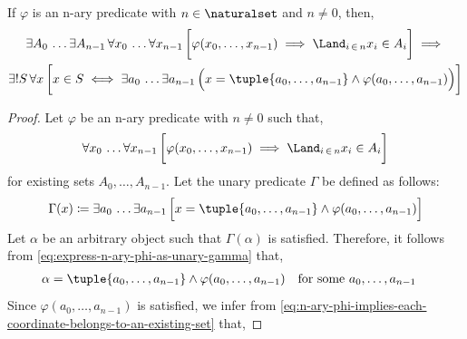 \begin{thm}
    \label{thm:sufficient-condition-for-unrestricted-specification-for-tuples}
    If \( \varphi \) is an n-ary predicate with \( n \in \naturalset \) and \( n \neq 0 \), then,
    \begin{multline*}
        \exists A_{0} \,\dots \exists A_{n-1} \, \forall x_{0} \,\dots \forall x_{n-1} \, \bigg[ \varphi(x_{0},\dots,x_{n-1})
        \implies \Land_{i \,{\in}\, n} x_{i} \in A_{i} \bigg] \implies \\
        \exists! S \, \forall x \, \bigg[ x \in S \iff \exists a_{0} \, \dots \exists a_{n-1} \, \Big( x = \tuple{a_{0},\dots,a_{n-1}} \land \varphi(a_{0},\dots,a_{n-1}) \Big) \bigg]
    \end{multline*}
\end{thm}

\begin{proof}
    Let \( \varphi \) be an n-ary predicate with \( n \neq 0 \) such that,
    \begin{equation}
        \label{eq:n-ary-phi-implies-each-coordinate-belongs-to-an-existing-set}
        \forall x_{0} \, \dots \forall x_{n-1} \, \bigg[ \varphi(x_{0},\dots,x_{n-1}) \implies \Land_{i \,\in\, n} x_{i} \in A_{i} \bigg]
    \end{equation}
    for existing sets \( A_{0},\dots,A_{n-1} \).
    Let the unary predicate \( \Gamma \) be defined as follows:
    \begin{equation}
        \label{eq:express-n-ary-phi-as-unary-gamma}
        \Gamma(x) \coloneq \exists a_{0} \, \dots \exists a_{n-1} \, \Big[ x = \tuple{a_{0},\dots,a_{n-1}} \land \varphi(a_{0},\dots,a_{n-1}) \Big]
    \end{equation}
    Let \( \alpha \) be an arbitrary object such that \( \Gamma(\alpha) \) is satisfied.
    Therefore, it follows from \eqref{eq:express-n-ary-phi-as-unary-gamma} that,
    \begin{equation*}
        \begin{aligned}
            \alpha = \tuple{a_{0}, \dots, a_{n-1}} \land \varphi(a_{0}, \dots, a_{n-1})&
        \end{aligned}
        \begin{aligned}
            &\text{for some \( a_{0}, \dots, a_{n-1} \)}
        \end{aligned}
    \end{equation*}
    Since \( \varphi(a_{0}, \dots, a_{n-1}) \) is satisfied, we infer from
    \eqref{eq:n-ary-phi-implies-each-coordinate-belongs-to-an-existing-set} that,

\end{proof}
